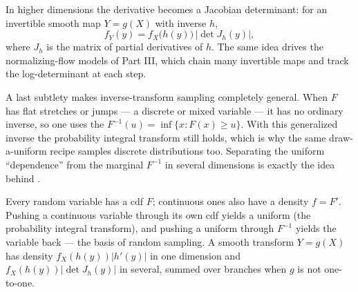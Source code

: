 \documentclass[11pt]{article}
\begin{document}
In higher dimensions the derivative becomes a Jacobian determinant: for an
invertible smooth map $Y = g(X)$ with inverse $h$,
\[
  f_Y(y) = f_X\!\big(h(y)\big)\,\big|\det J_h(y)\big|,
\]
where $J_h$ is the matrix of partial derivatives of $h$. The same idea
drives the normalizing-flow models of Part III, which chain many invertible
maps and track the log-determinant at each step.

A last subtlety makes inverse-transform sampling completely general. When
$F$ has flat stretches or jumps --- a discrete or mixed variable --- it has
no ordinary inverse, so one uses the 
$F^{-1}(u) = \inf\{x : F(x) \ge u\}$. With this generalized inverse the
probability integral transform still holds, which is why the same
draw-a-uniform recipe samples discrete distributions too. Separating the
uniform ``dependence'' from the marginal $F^{-1}$ in several dimensions is
exactly the idea behind .

\begin{summarybox}
Every random variable has a cdf $F$; continuous ones also have a density
$f = F'$. Pushing a continuous variable through its own cdf yields a uniform
(the probability integral transform), and pushing a uniform through $F^{-1}$
yields the variable back --- the basis of random sampling. A smooth transform
$Y=g(X)$ has density $f_X(h(y))|h'(y)|$ in one dimension and
$f_X(h(y))|\det J_h(y)|$ in several, summed over branches when $g$ is not
one-to-one.
\end{summarybox}
\end{document}
